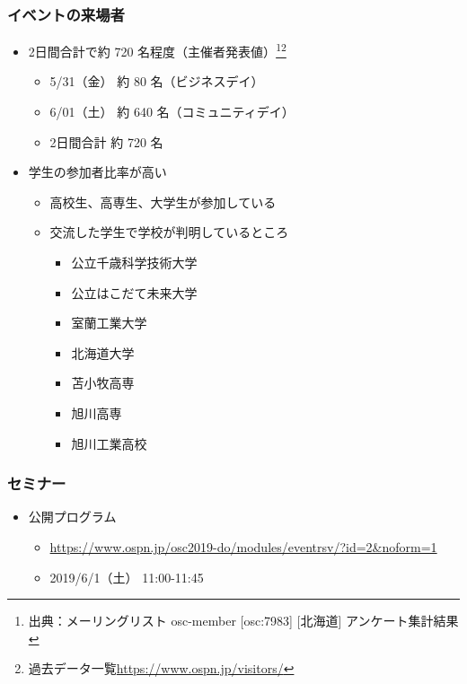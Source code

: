 \documentclass[mingoth,a4paper]{jsarticle}
\begin{document}
\subsubsection{イベントの来場者}

\begin{itemize}
\item 2日間合計で約 720 名程度（主催者発表値）\footnote{出典：メーリングリスト osc-member [osc:7983] [北海道] アンケート集計結果}\footnote{過去データ一覧\url{https://www.ospn.jp/visitors/}}
  \begin{itemize}
  \item 5/31（金） 約  80 名（ビジネスデイ）
  \item 6/01（土） 約 640 名（コミュニティデイ）
  \item 2日間合計  約 720 名
  \end{itemize}
\end{itemize}

\begin{itemize}
\item 学生の参加者比率が高い
  \begin{itemize}
  \item 高校生、高専生、大学生が参加している
  \item 交流した学生で学校が判明しているところ
    \begin{itemize}
    \item 公立千歳科学技術大学
    \item 公立はこだて未来大学
    \item 室蘭工業大学
    \item 北海道大学
    \item 苫小牧高専
    \item 旭川高専
    \item 旭川工業高校
    \end{itemize}
  \end{itemize}
\end{itemize}


\subsubsection{セミナー}

\begin{itemize}
\item 公開プログラム
  \begin{itemize}
  \item \url{https://www.ospn.jp/osc2019-do/modules/eventrsv/?id=2&noform=1}
  \item 2019/6/1（土） 11:00-11:45
  \end{itemize}
\end{itemize}
\end{document}
